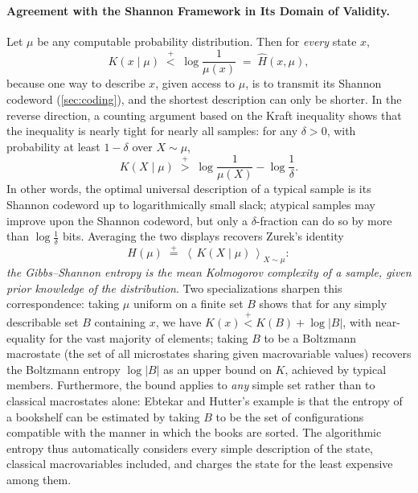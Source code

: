 \documentclass[11pt]{article}
\newcommand{\plt}{\mathrel{\stackrel{+}{<}}}
\newcommand{\pgt}{\mathrel{\stackrel{+}{>}}}
\newcommand{\peq}{\mathrel{\stackrel{+}{=}}}
\newcommand{\E}[1]{\left\langle #1 \right\rangle}
\begin{document}
\paragraph{Agreement with the Shannon Framework in Its Domain of Validity.} Let $\mu$ be any computable probability distribution. Then for \emph{every} state $x$,
\[
K(x \mid \mu) \;\plt\; \log \frac{1}{\mu(x)} \;=\; \hat H(x, \mu),
\]
because one way to describe $x$, given access to $\mu$, is to transmit its Shannon codeword (\cref{sec:coding}), and the shortest description can only be shorter. In the reverse direction, a counting argument based on the Kraft inequality shows that the inequality is nearly tight for nearly all samples: for any $\delta > 0$, with probability at least $1 - \delta$ over $X \sim \mu$,
\[
K(X \mid \mu) \;\pgt\; \log\frac{1}{\mu(X)} - \log \frac1\delta .
\]
In other words, the optimal universal description of a typical sample is its Shannon codeword up to logarithmically small slack; atypical samples may improve upon the Shannon codeword, but only a $\delta$-fraction can do so by more than $\log\frac1\delta$ bits. Averaging the two displays recovers Zurek's identity
\[
H(\mu) \;\peq\; \E{\,K(X \mid \mu)\,}_{X \sim \mu} :
\]
\emph{the Gibbs--Shannon entropy is the mean Kolmogorov complexity of a sample, given prior knowledge of the distribution}. Two specializations sharpen this correspondence: taking $\mu$ uniform on a finite set $B$ shows that for any simply describable set $B$ containing $x$, we have $K(x) \plt K(B) + \log |B|$, with near-equality for the vast majority of elements; taking $B$ to be a Boltzmann macrostate (the set of all microstates sharing given macrovariable values) recovers the Boltzmann entropy $\log|B|$ as an upper bound on $K$, achieved by typical members. Furthermore, the bound applies to \emph{any} simple set rather than to classical macrostates alone: Ebtekar and Hutter's example is that the entropy of a bookshelf can be estimated by taking $B$ to be the set of configurations compatible with the manner in which the books are sorted. The algorithmic entropy thus automatically considers every simple description of the state, classical macrovariables included, and charges the state for the least expensive among them.
\end{document}
